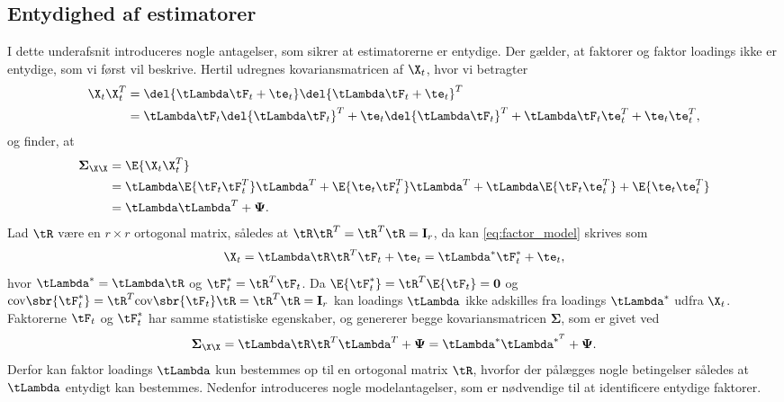 \subsection{Entydighed af estimatorer}
I dette underafsnit introduceres nogle antagelser, som sikrer at estimatorerne er entydige.
Der gælder, at faktorer og faktor loadings ikke er entydige, som vi først vil beskrive. 
Hertil udregnes kovariansmatricen af \(\X_t\), hvor vi betragter
\begin{align*}
\X_t \X_t^T &= \del{ \tLambda \tF_t + \te_t} \del{ \tLambda \tF_t + \te_t}^T \\
&= \tLambda \tF_t \del{\tLambda \tF_t }^T + \te_t \del{\tLambda \tF_t}^T + \tLambda \tF_t \te_t^T + \te_t \te_t^T,
\end{align*}
og finder, at
\begin{align*}
\boldsymbol{\Sigma}_{\X \X} &=  \E{\X_t \X_t^T} \\
&= \tLambda \E{\tF_t \tF_t^T} \tLambda^T + \E{\te_t \tF_t^T} \tLambda^T + \tLambda \E{\tF_t \te_t^T} + \E{\te_t \te_t^T} \\
&= \tLambda \tLambda^T + \boldsymbol{\Psi}.
\end{align*}
Lad \(\tR\) være en \(r \times r\) ortogonal matrix, således at \(\tR \tR^T = \tR^T \tR = \mathbf{I}_r\), da kan \eqref{eq:factor_model} skrives som
\begin{align*}
\X_t = \tLambda \tR \tR^T \tF_t + \te_t = \tLambda^* \tF_t^* + \te_t,
\end{align*}
hvor \(\tLambda^*=\tLambda \tR\) og \(\tF_t^*=\tR^T \tF_t\). 
Da \(\E{\tF_t^*} = \tR^T \E{\tF_t} = \mathbf{0}\) og \(\text{cov} \sbr{\tF^*_t} = \tR^T \text{cov} \sbr{\tF_t} \tR = \tR^T \tR = \mathbf{I}_r\) kan loadings \(\tLambda\) ikke adskilles fra loadings \(\tLambda^*\) udfra \(\X_t\).
Faktorerne \(\tF_t\) og \(\tF^*_t\) har samme statistiske egenskaber, og genererer begge kovariansmatricen \(\boldsymbol{\Sigma}\), som er givet ved
\begin{align*}
\boldsymbol{\Sigma}_{\X \X} = \tLambda \tR \tR^T \tLambda^T + \boldsymbol{\Psi} = \tLambda^* \tLambda^{*^T} + \boldsymbol{\Psi}.
\end{align*}
Derfor kan faktor loadings \(\tLambda\) kun bestemmes op til en ortogonal matrix \(\tR\), hvorfor der pålægges nogle betingelser således at \(\tLambda\) entydigt kan bestemmes.
Nedenfor introduceres nogle modelantagelser, som er nødvendige til at identificere entydige faktorer.
